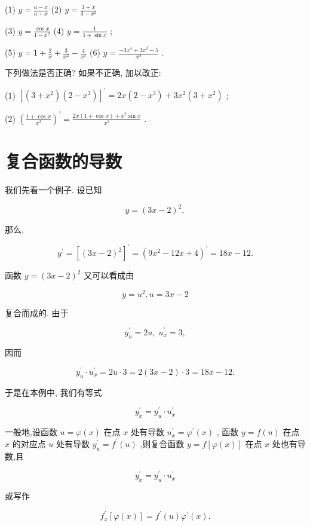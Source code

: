 \documentclass[lang=cn,newtx,10pt,scheme=chinese]{elegantbook}
\begin{document}
\begin{problemset}[练习]
(1) \(y = \frac{a - x}{a + x}\) (2) \(y = \frac{1 + x}{3 - {x}^{2}}\)

(3) \(y = \frac{\cos x}{1 - {x}^{2}}\) (4) \(y = \frac{1}{1 + \sin x}\) ;

(5) \(y = 1 + \frac{2}{x} + \frac{3}{{x}^{2}} - \frac{4}{{x}^{3}}\) (6) \(y = \frac{-3{x}^{4} + 3{x}^{2} - 5}{{x}^{3}}\) .

\item 下列做法是否正确? 如果不正确, 加以改正:

(1) \({\left\lbrack \left( 3 + {x}^{2}\right) \left( 2 - {x}^{3}\right) \right\rbrack }^{\prime } = {2x}\left( {2 - {x}^{3}}\right) + 3{x}^{2}\left( {3 + {x}^{2}}\right)\) ;

(2) \({\left( \frac{1 + \cos x}{{x}^{2}}\right) }^{\prime } = \frac{{2x}\left( {1 + \cos x}\right) + {x}^{2}\sin x}{{x}^{2}}\) .

\end{problemset}

\section{复合函数的导数}

我们先看一个例子. 设已知

\[
y = {\left( 3x - 2\right) }^{2},
\]

那么,

\[
{y}^{\prime } = {\left\lbrack {\left( 3x - 2\right) }^{2}\right\rbrack }^{\prime } = {\left( 9{x}^{2} - {12}x + 4\right) }^{\prime } = {18x} - {12}.
\]

函数 \(y = {\left( 3x - 2\right) }^{2}\) 又可以看成由

\[
y = {u}^{2},u = {3x} - 2
\]

复合而成的. 由于

\[
{y}_{u}^{\prime } = {2u},\;{u}_{x}^{\prime } = 3,
\]

因而

\[
{y}_{u}^{\prime } \cdot {u}_{x}^{\prime } = {2u} \cdot 3 = 2\left( {{3x} - 2}\right) \cdot 3 = {18x} - {12}.
\]

于是在本例中, 我们有等式

\[
{y}_{x}^{\prime } = {y}_{u}^{\prime } \cdot {u}_{x}^{\prime }
\]

\begin{proposition}[复合函数求导法则]

一般地,设函数 \(u = \varphi \left( x\right)\) 在点 \(x\) 处有导数 \({u}_{x}^{\prime } = {\varphi }^{\prime }\left( x\right)\) , 函数 \(y = f\left( u\right)\) 在点 \(x\) 的对应点 \(u\) 处有导数 \({y}_{u}^{\prime } = {f}^{\prime }\left( u\right)\) ,则复合函数 \(y = f\left\lbrack {\varphi \left( x\right) }\right\rbrack\) 在点 \(x\) 处也有导数,且

\[
{y}_{x}^{\prime } = {y}_{u}^{\prime } \cdot {u}_{x}^{\prime }
\]

或写作

\[
{f}_{x}^{\prime }\left\lbrack {\varphi \left( x\right) }\right\rbrack = {f}^{\prime }\left( u\right) {\varphi }^{\prime }\left( x\right) .
\]

\end{proposition}
\end{document}
